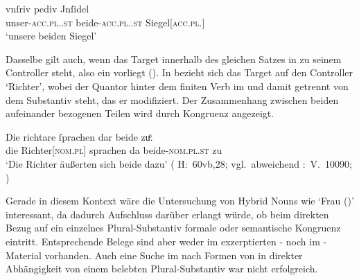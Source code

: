 \begin{exe}
\ex \label{ex:gendassgmt1_txt}
	\gll vnſriv pediv Jnſidel \\
		unser-\textsc{acc.pl.\NeutI.st} beide-\textsc{acc.pl.\NeutI.st}
			Siegel[\textsc{acc.pl.\NeutI}] \\
	\trans `unsere beiden Siegel'
		\parencites(Nr.~3224~A, Freising, 1299)[400,12--13]{cao4}
\end{exe}


Dasselbe gilt auch, wenn das Target innerhalb des gleichen Satzes in
 zu seinem Controller steht, also ein
 vorliegt (). In
 bezieht sich das Target  auf den Controller
 `Richter', wobei der Quantor hinter dem finiten Verb im
 und damit getrennt von dem Substantiv steht, das er
modifiziert. Der Zusammenhang zwischen beiden aufeinander bezogenen Teilen wird
durch Kongruenz angezeigt.

\begin{exe}
\ex \label{ex:gendassgmt2}
	\gll Die richtare ſprachen dar beide zuͦ. \\
		die Richter[\textsc{nom.pl\subM}] sprachen da
		beide-\textsc{nom.pl\subM.st} zu \\
	\trans `Die Richter äußerten sich beide dazu'
		(%
			H:~60vb,28; vgl.~abweichend
			\KC:~V.~10090;
			\cite[267]{schroeder1895}%
		)
\end{exe}

Gerade in diesem Kontext wäre die Untersuchung von Hybrid Nouns wie 
`Frau (\NeutF)' interessant, da dadurch Aufschluss darüber
erlangt würde, ob beim direkten Bezug auf ein einzelnes Plural-Substantiv
formale oder semantische
Kongruenz eintritt. Entsprechende Belege sind aber
weder im exzerptierten \CAO{}- noch im \KC{}-Material vorhanden. Auch eine
Suche im \REM{} nach Formen von  in direkter Abhängigkeit von einem
belebten Plural-Substantiv war nicht erfolgreich.

